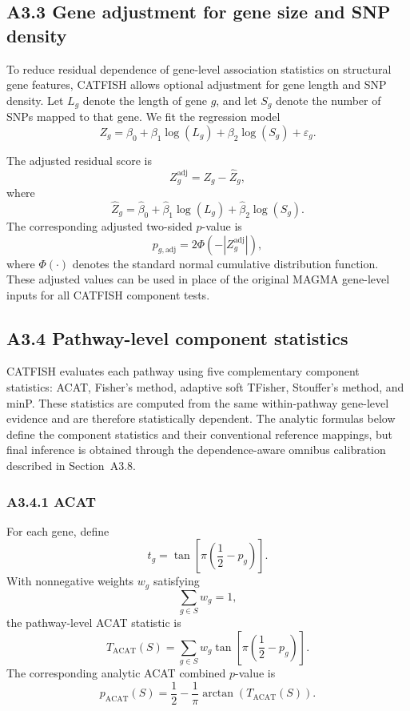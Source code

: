 \documentclass[unnumsec,webpdf,contemporary,large]{oup-authoring-template}%
\theoremstyle{thmstyleone}%
\theoremstyle{thmstyletwo}%
\theoremstyle{thmstylethree}%
\begin{document}
\begin{appendices}
\subsection{A3.3 Gene adjustment for gene size and SNP density}

To reduce residual dependence of gene-level association statistics on structural gene features, CATFISH allows optional adjustment for gene length and SNP density. Let $L_g$ denote the length of gene $g$, and let $S_g$ denote the number of SNPs mapped to that gene. We fit the regression model
\[
Z_g
=
\beta_0
+
\beta_1 \log(L_g)
+
\beta_2 \log(S_g)
+
\varepsilon_g.
\]

The adjusted residual score is
\[
Z_g^{\mathrm{adj}}
=
Z_g-\widehat{Z}_g,
\]
where
\[
\widehat{Z}_g
=
\widehat{\beta}_0
+
\widehat{\beta}_1 \log(L_g)
+
\widehat{\beta}_2 \log(S_g).
\]
The corresponding adjusted two-sided $p$-value is
\[
p_{g,\mathrm{adj}}
=
2\Phi\!\left(-\left|Z_g^{\mathrm{adj}}\right|\right),
\]
where $\Phi(\cdot)$ denotes the standard normal cumulative distribution function. These adjusted values can be used in place of the original MAGMA gene-level inputs for all CATFISH component tests.

\subsection{A3.4 Pathway-level component statistics}

CATFISH evaluates each pathway using five complementary component statistics: ACAT, Fisher's method, adaptive soft TFisher, Stouffer's method, and minP. These statistics are computed from the same within-pathway gene-level evidence and are therefore statistically dependent. The analytic formulas below define the component statistics and their conventional reference mappings, but final inference is obtained through the dependence-aware omnibus calibration described in Section~A3.8.

\subsubsection{A3.4.1 ACAT}

For each gene, define
\[
t_g
=
\tan\left[
\pi\left(\frac{1}{2}-p_g\right)
\right].
\]
With nonnegative weights $w_g$ satisfying
\[
\sum_{g\in S} w_g = 1,
\]
the pathway-level ACAT statistic is
\[
T_{\mathrm{ACAT}}(S)
=
\sum_{g\in S}
w_g
\tan\left[
\pi\left(\frac{1}{2}-p_g\right)
\right].
\]
The corresponding analytic ACAT combined $p$-value is
\[
p_{\mathrm{ACAT}}(S)
=
\frac{1}{2}
-
\frac{1}{\pi}
\arctan\left(T_{\mathrm{ACAT}}(S)\right).
\]


\end{appendices}
\end{document}
